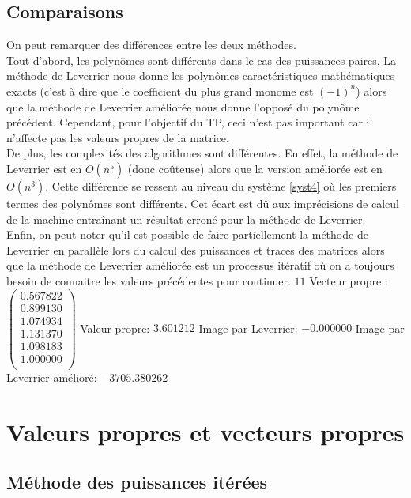 \documentclass{report}
\begin{document}
    \section{Comparaisons}
    On peut remarquer des différences entre les deux méthodes. \\
    
    Tout d'abord, les polynômes sont différents dans le cas des puissances paires. La méthode de Leverrier nous donne les polynômes caractéristiques mathématiques exacts (c'est à dire que le coefficient du plus grand monome est $(-1)^{n}$) alors que la méthode de Leverrier améliorée nous donne l'opposé du polynôme précédent. Cependant, pour l'objectif du TP, ceci n'est pas important car il n'affecte pas les valeurs propres de la matrice. \\
    
    De plus, les complexités des algorithmes sont différentes. En effet, la méthode de Leverrier est en $O(n^5)$ (donc coûteuse) alors que la version améliorée est en $O(n^3)$. Cette différence se ressent au niveau du système \eqref{syst4} où les premiers termes des polynômes sont différents. Cet écart est dû aux imprécisions de calcul de la machine entraînant un résultat erroné pour la méthode de Leverrier. \\
    
    Enfin, on peut noter qu'il est possible de faire partiellement la méthode de Leverrier en parallèle lors du calcul des puissances et traces des matrices alors que la méthode de Leverrier améliorée est un processus itératif où on a toujours besoin de connaitre les valeurs précédentes pour continuer.
    $ 11 $
Vecteur propre : 
$\begin{pmatrix}
0.567822 \\ 
0.899130 \\ 
1.074934 \\ 
1.131370 \\ 
1.098183 \\ 
1.000000 \\ 
\end{pmatrix}$
Valeur propre: $ 3.601212 $
Image par Leverrier: $ -0.000000 $
Image par Leverrier amélioré: $ -3705.380262 $
    \chapter{Valeurs propres et vecteurs propres}
    \section{Méthode des puissances itérées}
\end{document}
